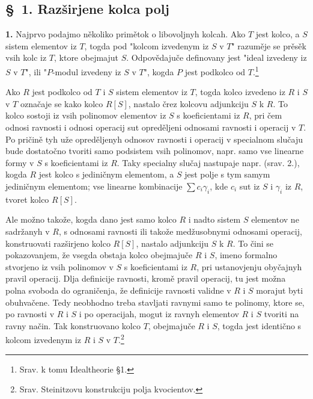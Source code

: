 \documentclass[11pt]{article}
\begin{document}
\setcounter{footnote}{9}

\subsection*{\S~1. Razširjene kolca polj}

\textbf{1.} Najprvo podajmo několiko primětok o libovoljnyh kolcah. Ako $T$ jest kolco, a $S$ sistem elementov iz $T$, togda pod "kolcom izvedenym iz $S$ v $T$" razuměje se prěsěk vsih kolc iz $T$, ktore obejmajut $S$. Odpovědajuče definovany jest "ideal izvedeny iz $S$ v $T$", ili "$P$-modul izvedeny iz $S$ v $T$", kogda $P$ jest podkolco od $T$.\footnote{Srav. k tomu Idealtheorie \S 1.}

Ako $R$ jest podkolco od $T$ i $S$ sistem elementov iz $T$, togda kolco izvedeno iz $R$ i $S$ v $T$ označaje se kako kolco $R[S]$, nastalo črez kolcovu adjunkciju $S$ k $R$. To kolco sostoji iz vsih polinomov elementov iz $S$ s koeficientami iz $R$, pri čem odnosi ravnosti i odnosi operacij sut opreděljeni odnosami ravnosti i operacij v $T$. Po pričině tyh uže opreděljenyh odnosov ravnosti i operacij v specialnom slučaju bude dostatočno tvoriti samo podsistem vsih polinomov, napr. samo vse linearne formy v $S$ s koeficientami iz $R$. Taky specialny slučaj nastupaje napr. (srav. 2.), kogda $R$ jest kolco s jediničnym elementom, a $S$ jest polje s tym samym jediničnym elementom; vse linearne kombinacije $\sum c_i\gamma_i$, kde $c_i$ sut iz $S$ i $\gamma_i$ iz $R$, tvoret kolco $R[S]$.

Ale možno takože, kogda dano jest samo kolco $R$ i nadto sistem $S$ elementov ne sadržanyh v $R$, s odnosami ravnosti ili takože medžusobnymi odnosami operacij, konstruovati razširjeno kolco $R[S]$, nastalo adjunkciju $S$ k $R$. To čini se pokazovanjem, že vsegda obstaja kolco obejmajuče $R$ i $S$, imeno formalno stvorjeno iz vsih polinomov v $S$ s koeficientami iz $R$, pri ustanovjenju obyčajnyh pravil operacij. Dlja definicije ravnosti, kromě pravil operacij, tu jest možna polna svoboda do ograničenja, že definicije ravnosti validne v $R$ i $S$ morajut byti obuhvačene. Tedy neobhodno treba stavljati ravnymi samo te polinomy, ktore se, po ravnosti v $R$ i $S$ i po operacijah, mogut iz ravnyh elementov $R$ i $S$ tvoriti na ravny način. Tak konstruovano kolco $T$, obejmajuče $R$ i $S$, togda jest identično s kolcom izvedenym iz $R$ i $S$ v $T$.\footnote{Srav. Steinitzovu konstrukciju polja kvocientov.}
\end{document}
